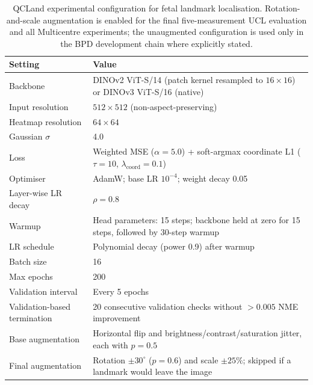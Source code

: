 \begin{table}[htbp]
  \centering
  \caption[QCLand experimental configuration.]
  {QCLand experimental configuration for fetal landmark localisation.
    Rotation-and-scale augmentation is enabled for the final
    five-measurement UCL evaluation and all Multicentre experiments;
    the unaugmented configuration is used only in the BPD development
    chain where explicitly stated.}
  \label{tab:default-config}
  \small
  \begin{tabular}{@{}p{}p{}@{}}
    \toprule
    Setting & Value \\
    \midrule
    Backbone
      & DINOv2 ViT-S/14 (patch kernel resampled to
        $16{\times}16$) or DINOv3 ViT-S/16 (native) \\
    Input resolution
      & $512 \times 512$ (non-aspect-preserving) \\
    Heatmap resolution
      & $64 \times 64$ \\
    Gaussian $\sigma$
      & 4.0 \\
    Loss
      & Weighted MSE ($\alpha{=}5.0$) + soft-argmax coordinate
        L1 ($\tau{=}10$, $\lambda_{\text{coord}}{=}0.1$) \\
    Optimiser
      & AdamW; base LR $10^{-4}$; weight decay 0.05 \\
    Layer-wise LR decay
      & $\rho = 0.8$ \\
    Warmup
      & Head parameters: 15 steps; backbone held at zero for
        15 steps, followed by 30-step warmup \\
    LR schedule
      & Polynomial decay (power 0.9) after warmup \\
    Batch size
      & 16 \\
    Max epochs
      & 200 \\
    Validation interval
      & Every 5 epochs \\
    Validation-based termination
      & 20 consecutive validation checks without
        $>0.005$ NME improvement \\
    Base augmentation
      & Horizontal flip and brightness/contrast/saturation jitter,
        each with $p{=}0.5$ \\
    Final augmentation
      & Rotation $\pm30^\circ$ ($p{=}0.6$) and scale
        $\pm25\%$; skipped if a landmark would leave the image \\
    \bottomrule
  \end{tabular}
\end{table}


